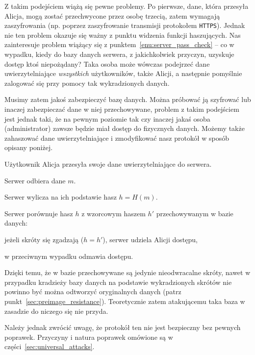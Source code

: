 \documentclass[12pt,a4paper,twoside]{article}
\begin{document}
Z takim podejściem wiążą się pewne problemy. Po pierwsze, dane, która przesyła
Alicja, mogą zostać przechwycone przez osobę trzecią, zatem wymagają
zaszyfrowania (np. poprzez zaszyfrowanie transmisji protokołem \texttt{HTTPS}).
Jednak nie ten problem okazuje się ważny z punktu widzenia funkcji haszujących.
Nas zainteresuje problem wiążący się z punktem~\ref{enu:server_pass_check} --
co w wypadku, kiedy do bazy danych serwera, z jakichkolwiek przyczyn, uzyskuje
dostęp ktoś niepożądany? Taka osoba może wówczas podejrzeć dane
uwierzytelniające \emph{wszystkich} użytkowników, także Alicji, a następnie
pomyślnie zalogować się przy pomocy tak wykradzionych danych.

Musimy zatem jakoś zabezpieczyć bazę danych. Można próbować ją szyfrować lub
inaczej zabezpieczać dane w niej przechowywane, problem z takim podejściem jest
jednak taki, że na pewnym poziomie tak czy inaczej jakaś osoba (administrator)
zawsze będzie miał dostęp do fizycznych danych. Możemy także zahaszować dane
uwierzytelniające i zmodyfikować nasz protokół w sposób opisany poniżej.

\begin{myenumerate}
\item Użytkownik Alicja przesyła swoje dane uwierzytelniające do serwera.
\item Serwer odbiera dane $m$.
\item Serwer wylicza na ich podstawie hasz $h = H(m)$.
\item Serwer porównuje hasz $h$ z wzorcowym haszem $h'$ przechowywanym w bazie
danych:
    \begin{myenumerate}
    \item jeżeli skróty się zgadzają ($h = h'$), serwer udziela Alicji dostępu,
    \item w przeciwnym wypadku odmawia dostępu.
    \end{myenumerate}
\end{myenumerate}

Dzięki temu, że w bazie przechowywane są jedynie nieodwracalne skróty, nawet w
przypadku kradzieży bazy danych na podstawie wykradzionych skrótów nie powinno
być można odtworzyć oryginalnych danych (patrz
punkt~\ref{sec:preimage_resistance}). Teoretycznie zatem atakującemu taka baza
w zasadzie do niczego się nie przyda.

Należy jednak zwrócić uwagę, że protokół ten nie jest bezpieczny bez pewnych
poprawek. Przyczyny i natura poprawek omówione są w
części~\ref{sec:universal_attacks}.
\end{document}
